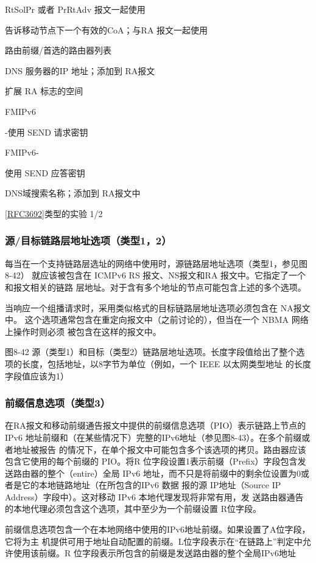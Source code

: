 RtSolPr 或者 PrRtAdv 报文一起使用

告诉移动节点下一个有效的CoA；与RA 报文一起使用

路由前缀/首选的路由器列表

DNS 服务器的IP 地址；添加到 RA报文

扩展 RA 标志的空间

FMIPv6

-使用 SEND 请求密钥

FMIPv6-

使用 SEND 应答密钥

DNS域搜索名称；添加到 RA报文中

\href{https://www.rfc-editor.org/rfc/rfc3692}{[RFC3692]}类型的实验 1/2

\subsubsection{源/目标链路层地址选项（类型1，2）}

每当在一个支持链路层选址的网络中使用时，源链路层地址选项（类型1，参见图8-42）
就应该被包含在 ICMPv6 RS 报文、NS报文和RA 报文中。它指定了一个和报文相关的链路
层地址。对于含有多个地址的节点可能包含上述的多个选项。

当响应一个组播请求时，采用类似格式的目标链路层地址选项必须包含在 NA报文中。
这个选项通常包含在重定向报文中（之前讨论的），但当在一个 NBMA 网络上操作时则必须
被包含在这样的报文中。

图8-42 源（类型1）和目标（类型2）链路层地址选项。长度字段值给出了整个选
项的长度，包括地址，以8字节为单位（例如，一个 IEEE 以太网类型地址
的长度字段值应该为1）

\subsubsection{前缀信息选项（类型3）}
在RA报文和移动前缀通告报文中提供的前缀信息选项（PIO）表示链路上节点的IPv6
地址前缀和（在某些情况下）完整的IPv6地址（参见图8-43）。在多个前缀或者地址被报告
的情况下，在单个报文中可能包含多个该选项的拷贝。路由器应该包含它使用的每个前缀的
PIO。将R 位字段设置1表示前缀（Prefix）字段包含发送路由器的整个（entire）全局 IPv6
地址，而不只是将前缀中的剩余位设置为0或者是它的本地链路地址（在所包含的IPv6 数据
报的源 IP地址（Source IP Address）字段中）。这对移动 IPv6 本地代理发现将非常有用，发
送路由器通告的本地代理必须包含这个选项，其中至少为一个前缀设置 R位字段。

前缀信息选项包含一个在本地网络中使用的IPv6地址前缀。如果设置了A位字段，它将为主
机提供可用于地址自动配置的前缀。L位字段表示在“在链路上”判定中允许使用该前缀。R
位字段表示所包含的前缀是发送路由器的整个全局IPv6地址

